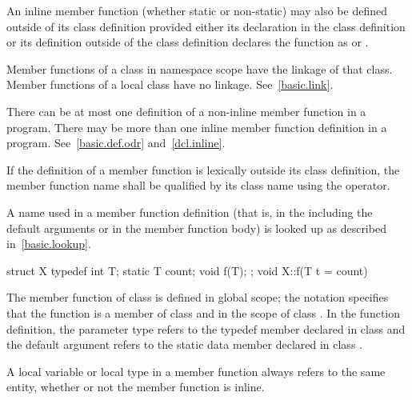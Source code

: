 \pnum
An inline member function (whether static or non-static) may
also be defined outside of its class definition provided either its
declaration in the class definition or its definition outside of the
class definition declares the function as  or .
\begin{note}
Member functions of a class in namespace scope have the linkage of that class.
Member functions of a local class have no linkage.
See~\ref{basic.link}.
\end{note}

\pnum
\begin{note}
There can be at most one definition of a non-inline member function in
a program. There may be more than one
inline member function definition in a program.
See~\ref{basic.def.odr} and~\ref{dcl.inline}.
\end{note}

\pnum
{}%
If the definition of a member function is lexically outside its class
definition, the member function name shall be qualified by its class
name using the \tcode{::} operator.
\begin{note}
A name used in a member function definition (that is, in the
 including the default
arguments or in the member function body) is looked up
as described in~\ref{basic.lookup}.
\end{note}
\begin{example}

\begin{codeblock}
struct X {
  typedef int T;
  static T count;
  void f(T);
};
void X::f(T t = count) { }
\end{codeblock}

The member function  of class  is defined in global
scope; the notation  specifies that the function 
is a member of class  and in the scope of class . In
the function definition, the parameter type  refers to the
typedef member  declared in class  and the default
argument  refers to the static data member 
declared in class .
\end{example}

\pnum
\begin{note}
A  local variable or local type in a member function always refers to
the same entity, whether or not the member function is inline.
\end{note}

